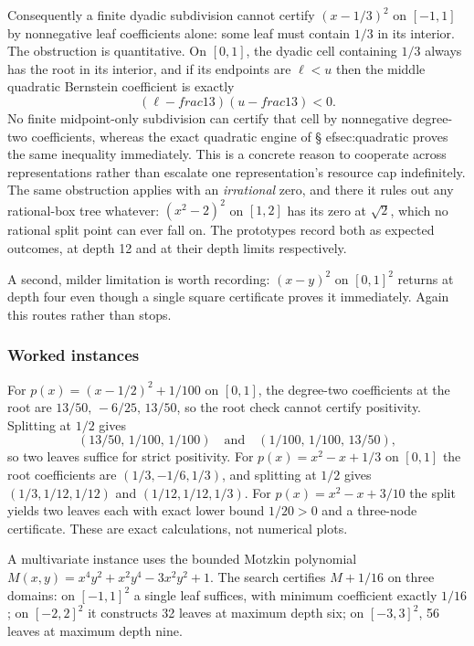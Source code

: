 Consequently a finite dyadic subdivision cannot certify $(x-1/3)^2$ on $[-1,1]$
by nonnegative leaf coefficients alone: some leaf must contain $1/3$ in its
interior. The obstruction is quantitative. On $[0,1]$, the dyadic cell
containing $1/3$ always has the root in its interior, and if its endpoints are
$\ell<u$ then the middle quadratic Bernstein coefficient is exactly
\[
 (\ell-	frac13)(u-	frac13)<0 .
\]
No finite midpoint-only subdivision can certify that cell by nonnegative
degree-two coefficients, whereas the exact quadratic engine of
\S
ef{sec:quadratic} proves the same inequality immediately. This is a
concrete reason to cooperate across representations rather than escalate one
representation's resource cap indefinitely. The same obstruction applies with an \emph{irrational} zero, and there
it rules out any rational-box tree whatever: $(x^2-2)^2$ on $[1,2]$ has its zero
at $\sqrt2$, which no rational split point can ever fall on. The prototypes
record both as expected \unknown{} outcomes, at depth 12 and at their depth
limits respectively.

A second, milder limitation is worth recording: $(x-y)^2$ on $[0,1]^2$ returns
\unknown{} at depth four even though a single square certificate proves it
immediately. Again this routes rather than stops.

\subsubsection*{Worked instances}

For $p(x)=(x-1/2)^2+1/100$ on $[0,1]$, the degree-two coefficients at the root
are $13/50,\,-6/25,\,13/50$, so the root check cannot certify positivity.
Splitting at $1/2$ gives
\[
 (13/50,\,1/100,\,1/100)\quad\text{and}\quad(1/100,\,1/100,\,13/50),
\]
so two leaves suffice for strict positivity. For $p(x)=x^2-x+1/3$ on $[0,1]$ the
root coefficients are $(1/3,-1/6,1/3)$, and splitting at $1/2$ gives
$(1/3,1/12,1/12)$ and $(1/12,1/12,1/3)$. For $p(x)=x^2-x+3/10$ the split yields
two leaves each with exact lower bound $1/20>0$ and a three-node certificate.
These are exact calculations, not numerical plots.

A multivariate instance uses the bounded Motzkin polynomial
$M(x,y)=x^4y^2+x^2y^4-3x^2y^2+1$. The search certifies $M+1/16$ on three
domains: on $[-1,1]^2$ a single leaf suffices, with minimum coefficient exactly
$1/16$; on $[-2,2]^2$ it constructs 32 leaves at maximum depth six; on
$[-3,3]^2$, 56 leaves at maximum depth nine.

